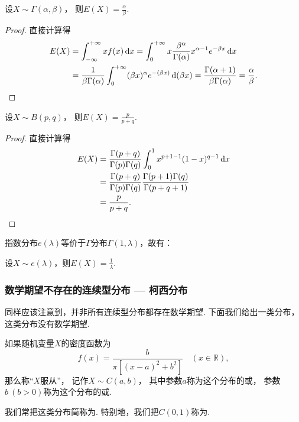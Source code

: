 \begin{theorem}\label{theorem:期望.伽马分布的期望}
设\(X \sim \Gamma(\alpha,\beta)\)，
则\(E(X)=\frac{\alpha}{\beta}\).
\begin{proof}
直接计算得\begin{align*}
	E(X)
	&= \int_{-\infty}^{+\infty} x f(x) \dd{x}
	= \int_0^{+\infty} x \frac{\beta^\alpha}{\Gamma(\alpha)} x^{\alpha-1} e^{-\beta x} \dd{x} \\
	&= \frac{1}{\beta \Gamma(\alpha)} \int_0^{+\infty} (\beta x)^\alpha e^{-(\beta x)} \dd(\beta x)
	= \frac{\Gamma(\alpha + 1)}{\beta \Gamma(\alpha)}
	= \frac{\alpha}{\beta}.
	\qedhere
\end{align*}
\end{proof}
\end{theorem}

\begin{theorem}\label{theorem:期望.贝塔分布的期望}
设\(X \sim B(p,q)\)，
则\(E(X)=\frac{p}{p+q}\).
\begin{proof}
直接计算得\begin{align*}
	E(X) &= \frac{\Gamma(p+q)}{\Gamma(p) \Gamma(q)}
		\int_0^1 x^{p+1-1} (1-x)^{q-1} \dd{x} \\
	&= \frac{\Gamma(p+q)}{\Gamma(p) \Gamma(q)}
		\frac{\Gamma(p+1) \Gamma(q)}{\Gamma(p+q+1)} \\
	&= \frac{p}{p+q}.
	\qedhere
\end{align*}
\end{proof}
\end{theorem}

指数分布\(e(\lambda)\)等价于\(\Gamma\)分布\(\Gamma(1,\lambda)\)，故有：
\begin{theorem}\label{theorem:随机变量的数字特征.指数分布的数学期望}
设\(X \sim e(\lambda)\)，则\(E(X) = \frac{1}{\lambda}\).
\end{theorem}

\subsubsection{数学期望不存在的连续型分布 --- 柯西分布}
同样应该注意到，并非所有连续型分布都存在数学期望.
下面我们给出一类分布，这类分布没有数学期望.

\begin{definition}
如果随机变量\(X\)的密度函数为\[
	f(x) = \frac{b}{\pi[(x-a)^2+b^2]}
	\quad(x\in\mathbb{R}),
\]
那么称“\(X\)服从”，
记作\(X \sim C(a,b)\)，
其中参数\(a\)称为这个分布的或，
参数\(b\ (b>0)\)称为这个分布的或.

我们常把这类分布简称为.
特别地，我们把\(C(0,1)\)称为.
\end{definition}

